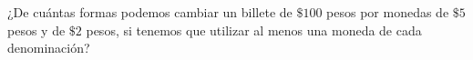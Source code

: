 ¿De cuántas formas podemos cambiar un billete de $\$100$ pesos por monedas de $\$5$ pesos y de $\$2$ pesos, si tenemos que utilizar al menos una moneda de cada denominación?